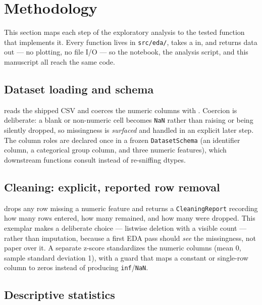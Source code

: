 \documentclass[
]{article}
\begin{document}
\newpage

\section{Methodology}\label{sec:methodology}

This section maps each step of the exploratory analysis to the tested
function that implements it. Every function lives in \texttt{src/eda/},
takes a  in, and returns data out --- no
plotting, no file I/O --- so the notebook, the analysis script, and this
manuscript all reach the same code.

\subsection{Dataset loading and
schema}\label{dataset-loading-and-schema}

 reads the shipped CSV and
coerces the numeric columns with
. Coercion is deliberate: a
blank or non-numeric cell becomes \texttt{NaN} rather than raising or
being silently dropped, so missingness is \emph{surfaced} and handled in
an explicit later step. The column roles are declared once in a frozen
\texttt{DatasetSchema} (an identifier column, a categorical group
column, and three numeric features), which downstream functions consult
instead of re-sniffing dtypes.

\subsection{Cleaning: explicit, reported row
removal}\label{cleaning-explicit-reported-row-removal}

 drops any row missing a
numeric feature and returns a \texttt{CleaningReport} recording how many
rows entered, how many remained, and how many were dropped. This
exemplar makes a deliberate choice --- listwise deletion with a visible
count --- rather than imputation, because a first EDA pass should
\emph{see} the missingness, not paper over it. A separate
 z-score standardizes the numeric columns
(mean 0, sample standard deviation 1), with a guard that maps a constant
or single-row column to zeros instead of producing
\texttt{inf}/\texttt{NaN}.

\subsection{Descriptive statistics}\label{descriptive-statistics}
\end{document}
